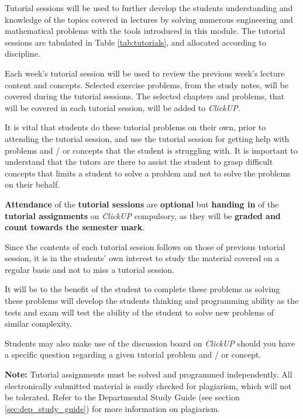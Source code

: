         Tutorial sessions will be used to further develop the students
        understanding and knowledge of the topics covered in lectures
        by solving numerous engineering and mathematical problems with
        the tools introduced in this module. The tutorial sessions are
        tabulated in Table \ref{tab:tutorials}, and allocated
        according to discipline.

        Each week's tutorial session will be used to review the
        previous week's lecture content and concepts. Selected
        exercise problems, from the study notes, will be covered
        during the tutorial sessions. The selected chapters and
        problems, that will be covered in each tutorial session, will
        be added to {\it ClickUP}.

        It is vital that students do these tutorial problems on their
        own, prior to attending the tutorial session, and use the
        tutorial session for getting help with problems and / or
        concepts that the student is struggling with. It is important
        to understand that the tutors are there to assist the student
        to grasp difficult concepts that limits a student to solve a
        problem and not to solve the problems on their behalf.

        \textbf{Attendance} of the \textbf{tutorial sessions}
        are \textbf{optional} but \textbf{handing in} of the
        \textbf{tutorial assignments} on {\it ClickUP}
          compulsory, as they will be \textbf{graded and count
          towards the semester mark}.

        Since the contents of each tutorial session follows on those
        of previous tutorial session, it is in the students’ own
        interest to study the material covered on a regular basis and
        not to miss a tutorial session.

        It will be to the benefit of the student to complete these
        problems as solving these problems will develop the students
        thinking and programming ability as the tests and exam will
        test the ability of the student to solve new problems of
        similar complexity.

        Students may also make use of the discussion board on {\it
          ClickUP} should you have a specific question regarding a
        given tutorial problem and / or concept.

        \textbf{Note:} Tutorial assignments must be solved and
        programmed independently. All electronically submitted
        material is easily checked for plagiarism, which will not be
        tolerated. Refer to the Departmental Study Guide (see section
        \ref{sec:dep_study_guide}) for more information on plagiarism.
